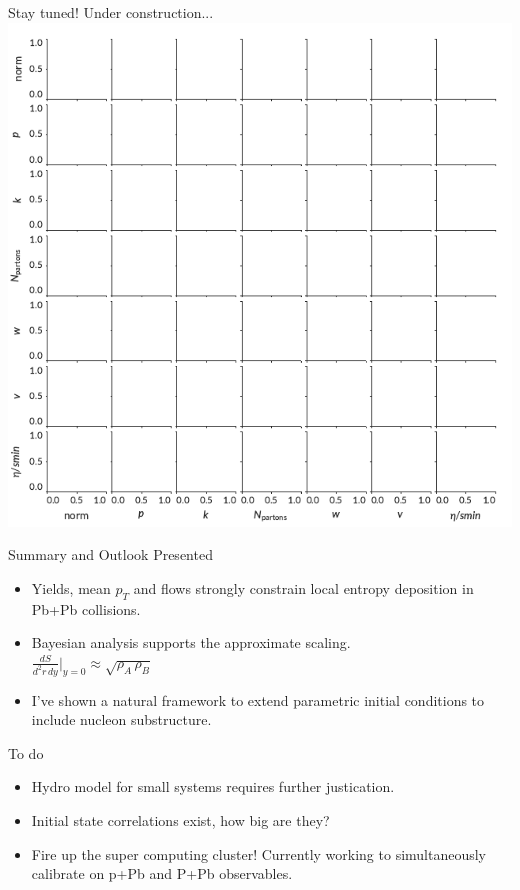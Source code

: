 \documentclass{beamer}
\begin{document}
\begin{frame}{Stay tuned! Under construction...}
  \centering
  \includegraphics[height=.82\textheight]{mock_posterior}
\end{frame}


\begin{frame}{Summary and Outlook}
  \large Presented \\
  \begin{itemize}
    \small
    \item Yields, mean $p_T$ and flows strongly constrain local entropy deposition in Pb+Pb collisions.
    \item Bayesian analysis supports the approximate scaling.\\[1ex]
      $\displaystyle \frac{dS}{d^2r\,dy}\Big\vert_{y=0} \approx \sqrt{\rho_A\, \rho_B}$\\[1ex]
    \item I've shown a natural framework to extend parametric initial conditions to include nucleon substructure.
  \end{itemize}
  \large To do \\
  \begin{itemize}
    \small
    \item Hydro model for small systems requires further justication.
    \item Initial state correlations exist, how big are they?
    \item Fire up the super computing cluster! Currently working to simultaneously calibrate on p+Pb and P+Pb observables.
  \end{itemize}

\end{frame}
\end{document}
